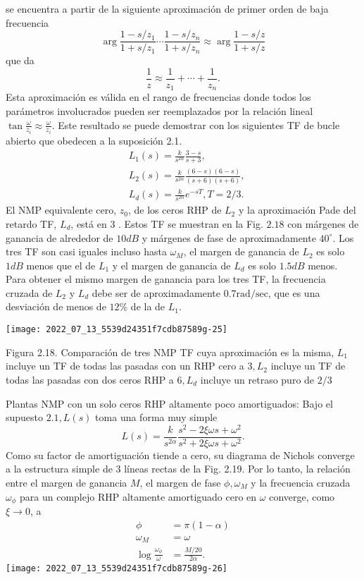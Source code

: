 se encuentra a partir de la siguiente aproximación de primer orden de baja frecuencia
$$
\arg \frac{1-s / z_{1}}{1+s / z_{1}} \cdots \frac{1-s / z_{n}}{1+s / z_{n}} \approx \arg \frac{1-s / z}{1+s / z}
$$
que da
$$
\frac{1}{z} \approx \frac{1}{z_{1}}+\cdots+\frac{1}{z_{n}} .
$$
Esta aproximación es válida en el rango de frecuencias donde todos los parámetros involucrados pueden ser reemplazados por la relación lineal $\tan \frac{\omega}{z_{i}} \approx \frac{\omega}{z_{i}}$. Este resultado se puede demostrar con los siguientes TF de bucle abierto que obedecen a la suposición 2.1.
$$
\begin{aligned}
&L_{1}(s)=\frac{k}{s^{2 \alpha}} \frac{3-s}{s+3}, \\
&L_{2}(s)=\frac{k}{s^{2 \alpha}} \frac{(6-s)(6-s)}{(s+6)(s+6)}, \\
&L_{d}(s)=\frac{k}{s^{2 \alpha}} e^{-s T}, T=2 / 3 .
\end{aligned}
$$
El NMP equivalente cero, $z_{0}$, de los ceros RHP de $L_{2}$ y la aproximación Pade del retardo TF, $L_{d}$, está en 3 . Estos TF se muestran en la Fig. $2.18$ con márgenes de ganancia de alrededor de $10 d B$ y márgenes de fase de aproximadamente $40^{\circ}$. Los tres TF son casi iguales incluso hasta $\omega_{M}$, el margen de ganancia de $L_{2}$ es solo $1 d B$ menos que el de $L_{1}$ y el margen de ganancia de $L_{d}$ es solo $1.5 d B$ menos. Para obtener el mismo margen de ganancia para los tres TF, la frecuencia cruzada de $L_{2}$ y $L_{d}$ debe ser de aproximadamente $0.7 \mathrm{rad} / \mathrm{sec}$, que es una desviación de menos de $12 \%$ de la de $L_{1}$.

\texttt{[image: 2022\_07\_13\_5539d24351f7cdb87589g-25]}

Figura 2.18. Comparación de tres NMP TF cuya aproximación es la misma, $L_{1}$ incluye un TF de todas las pasadas con un RHP cero a $3, L_{2}$ incluye un TF de todas las pasadas con dos ceros RHP a $6, L_{d}$ incluye un retraso puro de $2 / 3$

Plantas NMP con un solo ceros RHP altamente poco amortiguados: Bajo el supuesto $2.1, L(s)$ toma una forma muy simple
$$
L(s)=\frac{k}{s^{2 \alpha}} \frac{s^{2}-2 \xi \omega s+\omega^{2}}{s^{2}+2 \xi \omega s+\omega^{2}} .
$$
Como su factor de amortiguación tiende a cero, su diagrama de Nichols converge a la estructura simple de 3 líneas rectas de la Fig. 2.19. Por lo tanto, la relación entre el margen de ganancia $M$, el margen de fase $\phi, \omega_{M}$ y la frecuencia cruzada $\omega_{\phi}$ para un complejo RHP altamente amortiguado cero en $\omega$ converge, como $\xi \rightarrow 0$, a
$$
\begin{aligned}
\phi &=\pi(1-\alpha) \\
\omega_{M} &=\omega \\
\log \frac{\omega_{\phi}}{\omega} &=\frac{M / 20}{2 \alpha} .
\end{aligned}
$$
\texttt{[image: 2022\_07\_13\_5539d24351f7cdb87589g-26]}


